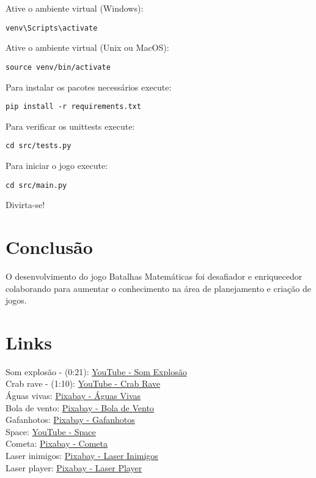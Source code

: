 \documentclass[12pt,a4paper]{article}
\begin{document}
Ative o ambiente virtual (Windows):
\begin{verbatim}
venv\Scripts\activate
\end{verbatim}

Ative o ambiente virtual (Unix ou MacOS):
\begin{verbatim}
source venv/bin/activate
\end{verbatim}

Para instalar os pacotes necessários execute:
\begin{verbatim}
pip install -r requirements.txt
\end{verbatim}

Para verificar os unittests execute:
\begin{verbatim}
cd src/tests.py
\end{verbatim}

Para iniciar o jogo execute:
\begin{verbatim}
cd src/main.py
\end{verbatim}

Divirta-se!

\section {Conclusão}
O desenvolvimento do jogo Batalhas Matemáticas foi desafiador e enriquecedor colaborando para aumentar o conhecimento na área de planejamento e criação de jogos.

\section{Links}
Som explosão - (0:21): \href{https://www.youtube.com/watch?v=jajIP4m6HfU}{YouTube - Som Explosão}\\
Crab rave - (1:10): \href{https://www.youtube.com/watch?v=cE0wfjsybIQ}{YouTube - Crab Rave}\\
Águas vivas: \href{https://pixabay.com/pt/sound-effects/funny-bubbles-96203/}{Pixabay - Águas Vivas}\\
Bola de vento: \href{https://pixabay.com/pt/sound-effects/wind-91882/}{Pixabay - Bola de Vento}\\
Gafanhotos: \href{https://pixabay.com/pt/sound-effects/criquet-2-72941/}{Pixabay - Gafanhotos}\\
Space: \href{https://www.youtube.com/watch?v=TQ-Fv7bbJgM}{YouTube - Space}\\
Cometa: \href{https://pixabay.com/sound-effects/fireball-whoosh-7-201453/}{Pixabay - Cometa}\\
Laser inimigos: \href{https://pixabay.com/pt/sound-effects/laser-14792/}{Pixabay - Laser Inimigos}\\
Laser player: \href{https://pixabay.com/pt/sound-effects/laser-104024/}{Pixabay - Laser Player}\\
\end{document}
